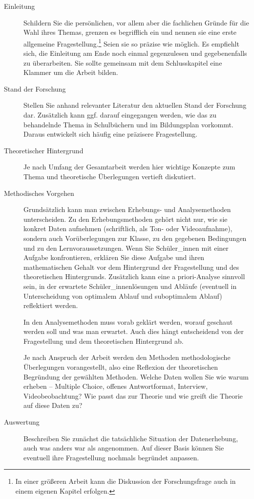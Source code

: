 \documentclass[ngerman,bibliography=totoc,oneside,12pt,a4paper]{scrbook}
\begin{document}
\begin{description}
\item[Einleitung]
Schildern Sie die persönlichen, vor allem aber die fachlichen Gründe für
die Wahl ihres Themas, grenzen es begrifflich ein und nennen sie eine
erste allgemeine Fragestellung.\footnote{In einer größeren Arbeit kann
  die Diskussion der Forschungsfrage auch in einem eigenen Kapitel
  erfolgen.} Seien sie so präzise wie möglich. Es empfiehlt sich, die
Einleitung am Ende noch einmal gegenzulesen und gegebenenfalls zu
überarbeiten. Sie sollte gemeinsam mit dem Schlusskapitel eine Klammer
um die Arbeit bilden.
\item[Stand der Forschung]
Stellen Sie anhand relevanter Literatur den aktuellen Stand der
Forschung dar. Zusätzlich kann ggf. darauf eingegangen werden, wie das
zu behandelnde Thema in Schulbüchern und im Bildungsplan vorkommt.
Daraus entwickelt sich häufig eine präzisere Fragestellung.
\item[Theoretischer Hintergrund]
Je nach Umfang der Gesamtarbeit werden hier wichtige Konzepte zum Thema
und theoretische Überlegungen vertieft diskutiert.
\item[Methodisches Vorgehen]
Grundsätzlich kann man zwischen Erhebungs- und Analysemethoden
unterscheiden. Zu den Erhebungsmethoden gehört nicht nur, wie sie
konkret Daten aufnehmen (schriftlich, als Ton- oder Videoaufnahme),
sondern auch Vorüberlegungen zur Klasse, zu den gegebenen Bedingungen
und zu den Lernvoraussetzungen. Wenn Sie Schüler\_innen mit einer
Aufgabe konfrontieren, erklären Sie diese Aufgabe und ihren
mathematischen Gehalt vor dem Hintergrund der Fragestellung und des
theoretischen Hintergrunds. Zusätzlich kann eine a priori-Analyse
sinnvoll sein, in der erwartete Schüler\_innenlösungen und Abläufe
(eventuell in Unterscheidung von optimalem Ablauf und suboptimalem
Ablauf) reflektiert werden.

In den Analysemethoden muss vorab geklärt werden, worauf geschaut werden
soll und was man erwartet. Auch dies hängt entscheidend von der
Fragestellung und dem theoretischen Hintergrund ab.

Je nach Anspruch der Arbeit werden den Methoden methodologische
Überlegungen vorangestellt, also eine Reflexion der theoretischen
Begründung der gewählten Methoden. Welche Daten wollen Sie wie warum
erheben -- Multiple Choice, offenes Antwortformat, Interview,
Videobeobachtung? Wie passt das zur Theorie und wie greift die Theorie
auf diese Daten zu?
\item[Auswertung]
Beschreiben Sie zunächst die tatsächliche Situation der Datenerhebung,
auch was anders war als angenommen. Auf dieser Basis können Sie
eventuell ihre Fragestellung nochmals begründet anpassen.


\end{description}
\end{document}

